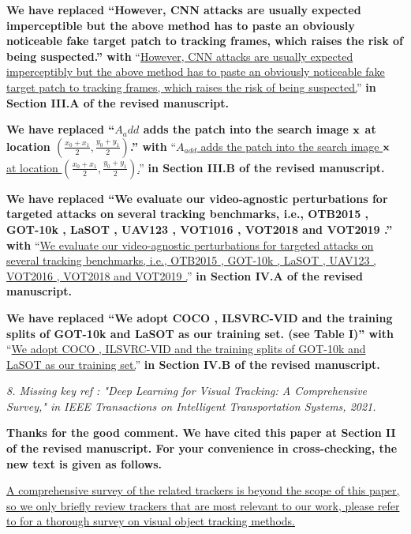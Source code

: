\documentclass[12pt]{article}
\begin{document}
\textbf{We have replaced ``However, CNN attacks are usually expected imperceptible but the above method has to paste an obviously noticeable fake target patch to tracking frames, which raises the risk of being suspected.'' with}
``\uline{However, CNN attacks are usually expected imperceptibly but the above method has to paste an obviously noticeable fake target patch to tracking frames, which raises the risk of being suspected.}''
\textbf{in Section III.A of the revised manuscript.}

\textbf{We have  replaced ``$A_add$ adds the patch into the search image $\textbf x$ at location $(\frac{x_0+x_1}{2},\frac{y_0+y_1}{2})$.'' with}
``\uline{$A_{add}$ adds the patch into the search image $\textbf x$ at location $(\frac{x_0+x_1}{2},\frac{y_0+y_1}{2})$.}''
\textbf{in Section III.B of the revised manuscript.}

\textbf{We have replaced ``We evaluate our video-agnostic perturbations for targeted attacks on several tracking benchmarks, i.e., OTB2015 \cite{OTB}, GOT-10k \cite{GOT-10k}, LaSOT \cite{LaSOT}, UAV123 \cite{UAV123}, VOT1016 \cite{VOT2016}, VOT2018 \cite{VOT2018} and VOT2019 \cite{VOT2019}.'' with}
``\uline{We evaluate our video-agnostic perturbations for targeted attacks on several tracking benchmarks, i.e., OTB2015 \cite{OTB}, GOT-10k \cite{GOT-10k}, LaSOT \cite{LaSOT}, UAV123 \cite{UAV123}, VOT2016 \cite{VOT2016}, VOT2018 \cite{VOT2018} and VOT2019 \cite{VOT2019}.}''
\textbf{in Section IV.A of the revised manuscript.}

\textbf{We have replaced ``We adopt COCO \cite{COCO}, ILSVRC-VID \cite{VID} and the training splits of GOT-10k \cite{GOT-10k} and LaSOT \cite{LaSOT} as our training set. (see Table I)'' with}
``\uline{We adopt COCO \cite{COCO}, ILSVRC-VID \cite{VID} and the training splits of GOT-10k \cite{GOT-10k} and LaSOT \cite{LaSOT} as our training set.}''
\textbf{in Section IV.B of the revised manuscript.}

\textit{8. Missing key ref : "Deep Learning for Visual Tracking: A Comprehensive Survey," in IEEE Transactions on Intelligent Transportation Systems, 2021.}

\textbf{Thanks for the good comment. We have cited this paper at Section II of the revised manuscript.  For your convenience in cross-checking, the new text is given as follows.}

\uline{A comprehensive survey of the related trackers is beyond the scope of this paper, so we only briefly review trackers that are most relevant to our work, please refer to \cite{9339950} for a thorough survey on visual object tracking methods.}
\end{document}
